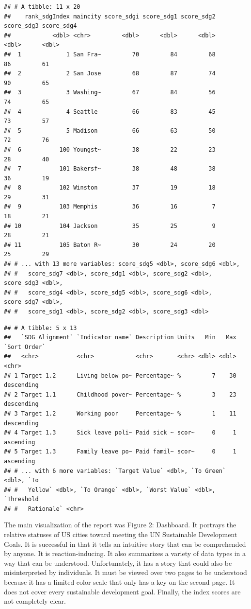\documentclass[]{article}
\begin{document}
\begin{verbatim}
## # A tibble: 11 x 20
##    rank_sdgIndex maincity score_sdgi score_sdg1 score_sdg2 score_sdg3 score_sdg4
##            <dbl> <chr>         <dbl>      <dbl>      <dbl>      <dbl>      <dbl>
##  1             1 San Fra~         70         84         68         86         61
##  2             2 San Jose         68         87         74         90         65
##  3             3 Washing~         67         84         56         74         65
##  4             4 Seattle          66         83         45         73         57
##  5             5 Madison          66         63         50         72         76
##  6           100 Youngst~         38         22         23         28         40
##  7           101 Bakersf~         38         48         38         36         19
##  8           102 Winston          37         19         18         29         31
##  9           103 Memphis          36         16          7         18         21
## 10           104 Jackson          35         25          9         28         21
## 11           105 Baton R~         30         24         20         25         29
## # ... with 13 more variables: score_sdg5 <dbl>, score_sdg6 <dbl>,
## #   score_sdg7 <dbl>, score_sdg1 <dbl>, score_sdg2 <dbl>, score_sdg3 <dbl>,
## #   score_sdg4 <dbl>, score_sdg5 <dbl>, score_sdg6 <dbl>, score_sdg7 <dbl>,
## #   score_sdg1 <dbl>, score_sdg2 <dbl>, score_sdg3 <dbl>
\end{verbatim}

\begin{verbatim}
## # A tibble: 5 x 13
##   `SDG Alignment` `Indicator name` Description Units   Min   Max `Sort Order`
##   <chr>           <chr>            <chr>       <chr> <dbl> <dbl> <chr>       
## 1 Target 1.2      Living below po~ Percentage~ %         7    30 descending  
## 2 Target 1.1      Childhood pover~ Percentage~ %         3    23 descending  
## 3 Target 1.2      Working poor     Percentage~ %         1    11 descending  
## 4 Target 1.3      Sick leave poli~ Paid sick ~ scor~     0     1 ascending   
## 5 Target 1.3      Family leave po~ Paid famil~ scor~     0     1 ascending   
## # ... with 6 more variables: `Target Value` <dbl>, `To Green` <dbl>, `To
## #   Yellow` <dbl>, `To Orange` <dbl>, `Worst Value` <dbl>, `Threshold
## #   Rationale` <chr>
\end{verbatim}

The main visualization of the report was Figure 2: Dashboard. It
portrays the relative statuses of US cities toward meeting the UN
Sustainable Development Goals. It is successful in that it tells an
intuitive story that can be comprehended by anyone. It is
reaction-inducing. It also summarizes a variety of data types in a way
that can be understood. Unfortunately, it has a story that could also be
misinterpreted by individuals. It must be viewed over two pages to be
understood because it has a limited color scale that only has a key on
the second page. It does not cover every sustainable development goal.
Finally, the index scores are not completely clear.
\end{document}
